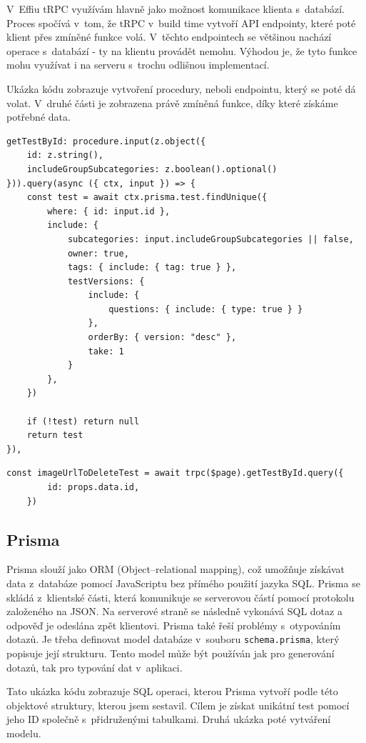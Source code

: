\documentclass[12pt, a4paper,
openright
]{report}
\begin{document}
V~Effiu tRPC využívám hlavně jako možnost komunikace klienta s~databází. Proces spočívá v~tom, že tRPC v~build time vytvoří API endpointy, které poté klient přes zmíněné funkce volá. V~těchto endpointech se většinou nachází operace s~databází - ty na klientu provádět nemohu. Výhodou je, že tyto funkce mohu využívat i na serveru s~trochu odlišnou implementací.

Ukázka kódu zobrazuje vytvoření procedury, neboli endpointu, který se poté dá volat. V~druhé části je zobrazena právě zmíněná funkce, díky které získáme potřebné data.

\begin{lstlisting}[style=ES6, caption=Endpoint generovaný pomocí tRPC, label=trpc_code]
getTestById: procedure.input(z.object({
	id: z.string(),
	includeGroupSubcategories: z.boolean().optional()
})).query(async ({ ctx, input }) => {
	const test = await ctx.prisma.test.findUnique({
		where: { id: input.id },
		include: {
			subcategories: input.includeGroupSubcategories || false,
			owner: true,
			tags: {	include: { tag: true } },
			testVersions: {
				include: {
					questions: { include: { type: true } }
				},
				orderBy: { version: "desc" },
				take: 1
			}
		},
	})
	
	if (!test) return null
	return test
}),
\end{lstlisting}
\begin{lstlisting}[style=ES6, caption=Volání funkce pomocí tRPC klienta s metodou getTestById, label=trpc_code_use]
	const imageUrlToDeleteTest = await trpc($page).getTestById.query({
		id: props.data.id,
	})
\end{lstlisting}
\subsection{Prisma}
Prisma slouží jako ORM (Object–relational mapping), což umožňuje získávat data z~databáze pomocí JavaScriptu bez přímého použití jazyka SQL. Prisma se skládá z~klientské části, která komunikuje se serverovou částí pomocí protokolu založeného na JSON. Na serverové straně se následně vykonává SQL dotaz a odpověď je odeslána zpět klientovi. Prisma také řeší problémy s~otypováním dotazů. Je třeba definovat model databáze v~souboru \texttt{schema.prisma}, který popisuje její strukturu. Tento model může být používán jak pro generování dotazů, tak pro typování dat v~aplikaci.

Tato ukázka kódu zobrazuje SQL operaci, kterou Prisma vytvoří podle této objektové struktury, kterou jsem sestavil. Cílem je získat unikátní test pomocí jeho ID společně s~přidruženými tabulkami. Druhá ukázka poté vytváření modelu.
\end{document}
